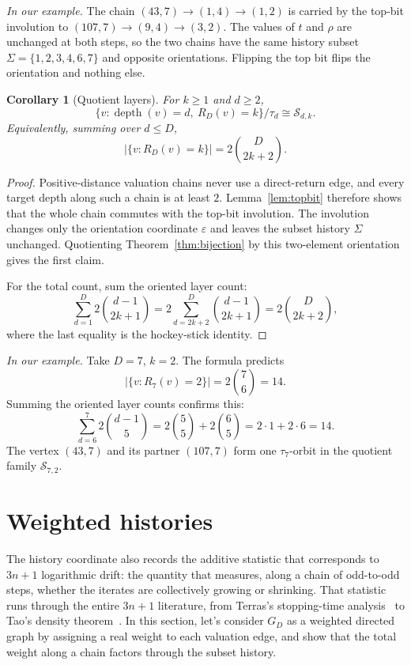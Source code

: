 \documentclass[11pt]{amsart}
\newtheorem{corollary}[theorem]{Corollary}
\theoremstyle{definition}
\theoremstyle{remark}
\newcommand{\depth}{\operatorname{depth}}
\newcommand{\Sfam}{\mathcal S}
\newcommand{\eps}{\varepsilon}
\begin{document}
\textit{In our example.}
The chain
\(
(43,7)\to(1,4)\to(1,2)
\)
is carried by the top-bit involution to
\(
(107,7)\to(9,4)\to(3,2).
\)
The values of $t$ and $\rho$ are unchanged at both steps, so the two
chains have the same history subset
\(
\Sigma=\{1,2,3,4,6,7\}
\)
and opposite orientations. Flipping the top bit flips the orientation and nothing else.

\begin{corollary}[Quotient layers]\label{cor:quotient}
For $k\ge1$ and $d\ge2$,
\[
\{v:\depth(v)=d,\ R_D(v)=k\}/\tau_d
\cong
\Sfam_{d,k}.
\]
Equivalently, summing over $d\le D$,
\[
\bigl|\{v:R_D(v)=k\}\bigr|=2\binom{D}{2k+2}.
\]
\end{corollary}

\begin{proof}
Positive-distance valuation chains never use a direct-return edge, and
every target depth along such a chain is at least $2$.
Lemma~\ref{lem:topbit} therefore shows that the whole chain commutes
with the top-bit involution.  The involution changes only the
orientation coordinate $\eps$ and leaves the subset history $\Sigma$
unchanged.  Quotienting Theorem~\ref{thm:bijection} by this
two-element orientation gives the first claim.

For the total count, sum the oriented layer count:
\[
\sum_{d=1}^D2\binom{d-1}{2k+1}
=
2\sum_{d=2k+2}^D\binom{d-1}{2k+1}
=
2\binom{D}{2k+2},
\]
where the last equality is the hockey-stick identity.
\end{proof}

\textit{In our example.}
Take $D=7$, $k=2$.  The formula predicts
\[
\bigl|\{v:R_7(v)=2\}\bigr|=2\binom{7}{6}=14.
\]
Summing the oriented layer counts confirms this:
\[
\sum_{d=6}^{7}2\binom{d-1}{5}
=2\binom{5}{5}+2\binom{6}{5}
=2\cdot1+2\cdot6=14.
\]
The vertex $(43,7)$ and its partner $(107,7)$ form one
$\tau_7$-orbit in the quotient family $\Sfam_{7,2}$.

\section{Weighted histories}\label{sec:weighted}
The history coordinate also records the additive statistic that corresponds to $3n+1$ logarithmic drift: the quantity that measures, along a chain of odd-to-odd steps, whether the iterates are collectively growing or shrinking.  That statistic runs through the entire $3n+1$ literature, from Terras's stopping-time analysis~\cite{Terras1976} to Tao's density theorem~\cite{Tao2022}.  In this section, let's consider $G_D$ as a weighted directed graph by assigning a real weight to each valuation edge, and show that the total weight along a chain factors through the subset history.
\end{document}
